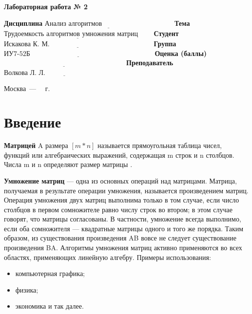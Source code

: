 \documentclass[12pt]{report}
\begin{document}
\begin{center}
\Large\textbf{Лабораторная работа № 2}
\end{center}
\vspace{\baselineskip}
\noindent\textbf{Дисциплина} $\underline{\text{Анализ алгоритмов~~~~~~~~~~~~~~~~~~~~~~~~~~~~~~~}}$\newline\newline
\noindent\textbf{Тема} $\underline{\text{Трудоемкость алгоритмов умножения матриц~~~~~~}}$\newline\newline
\noindent\textbf{Студент} $\underline{\text{Искакова К. М.~~~~~~~~~~~~~~~~~~~~~~~~~~~~~~~~~~~~~~~~~~~~~}}$\newline\newline
\noindent\textbf{Группа} $\underline{\text{ИУ7-52Б~~~~~~~~~~~~~~~~~~~~~~~~~~~~~~~~~~~~~~~~~~~~~~~~~~~~~~}}$\newline\newline
\noindent\textbf{Оценка (баллы)} $\underline{\text{~~~~~~~~~~~~~~~~~~~~~~~~~~~~~~~~~~~~~~~~~~~~~~~~~~~~~}}$\newline\newline
\noindent\textbf{Преподаватель} $\underline{\text{Волкова Л. Л.~~~~~~~~~~~~~~~~~~~~~~~~~~~~~~~~~~~}}$\newline

\begin{center}
	\vfill
	Москва~---~\the\year
	~г.
\end{center}
\clearpage

\tableofcontents

\newpage
\chapter*{Введение}
\textbf{Матрицей} A размера $[m*n]$ называется прямоугольная таблица
чисел, функций или алгебраических выражений, содержащая m строк и n столбцов. Числа m и n определяют размер матрицы \cite{mtrbook}. 

\textbf{Умножение матриц} — одна из основных операций над матрицами.
Матрица, получаемая в результате операции умножения, называется
произведением матриц. Операция умножения двух матриц выполнима только в
том случае, если число столбцов в первом сомножителе равно числу строк во
втором; в этом случае говорят, что матрицы согласованы. В частности,
умножение всегда выполнимо, если оба сомножителя — квадратные матрицы
одного и того же порядка. Таким образом, из существования произведения AB
вовсе не следует существование произведения BA.
Алгоритмы умножения матриц активно применяются во всех областях, применяющих
линейную алгебру. Примеры использования:
\begin{itemize}
	\item компьютерная графика;
	\item физика;
	\item экономика и так далее.
\end{itemize}
\vspace{\baselineskip}
\end{document}
